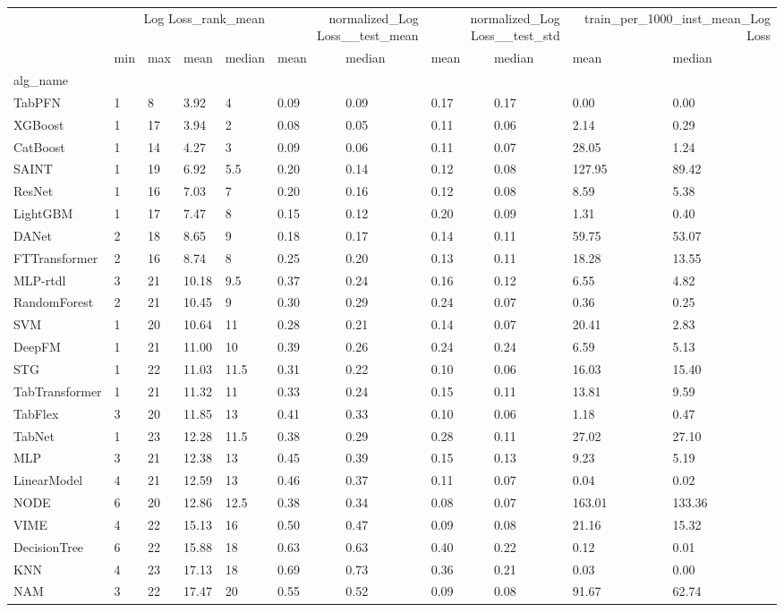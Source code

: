 \begin{tabular}{lllllllllll}
\toprule
 & \multicolumn{4}{r}{Log Loss_rank_mean} & \multicolumn{2}{r}{normalized_Log Loss__test_mean} & \multicolumn{2}{r}{normalized_Log Loss__test_std} & \multicolumn{2}{r}{train_per_1000_inst_mean_Log Loss} \\
 & min & max & mean & median & mean & median & mean & median & mean & median \\
alg_name &  &  &  &  &  &  &  &  &  &  \\
\midrule
TabPFN & 1 & 8 & 3.92 & 4 & 0.09 & 0.09 & 0.17 & 0.17 & 0.00 & 0.00 \\
XGBoost & 1 & 17 & 3.94 & 2 & 0.08 & 0.05 & 0.11 & 0.06 & 2.14 & 0.29 \\
CatBoost & 1 & 14 & 4.27 & 3 & 0.09 & 0.06 & 0.11 & 0.07 & 28.05 & 1.24 \\
SAINT & 1 & 19 & 6.92 & 5.5 & 0.20 & 0.14 & 0.12 & 0.08 & 127.95 & 89.42 \\
ResNet & 1 & 16 & 7.03 & 7 & 0.20 & 0.16 & 0.12 & 0.08 & 8.59 & 5.38 \\
LightGBM & 1 & 17 & 7.47 & 8 & 0.15 & 0.12 & 0.20 & 0.09 & 1.31 & 0.40 \\
DANet & 2 & 18 & 8.65 & 9 & 0.18 & 0.17 & 0.14 & 0.11 & 59.75 & 53.07 \\
FTTransformer & 2 & 16 & 8.74 & 8 & 0.25 & 0.20 & 0.13 & 0.11 & 18.28 & 13.55 \\
MLP-rtdl & 3 & 21 & 10.18 & 9.5 & 0.37 & 0.24 & 0.16 & 0.12 & 6.55 & 4.82 \\
RandomForest & 2 & 21 & 10.45 & 9 & 0.30 & 0.29 & 0.24 & 0.07 & 0.36 & 0.25 \\
SVM & 1 & 20 & 10.64 & 11 & 0.28 & 0.21 & 0.14 & 0.07 & 20.41 & 2.83 \\
DeepFM & 1 & 21 & 11.00 & 10 & 0.39 & 0.26 & 0.24 & 0.24 & 6.59 & 5.13 \\
STG & 1 & 22 & 11.03 & 11.5 & 0.31 & 0.22 & 0.10 & 0.06 & 16.03 & 15.40 \\
TabTransformer & 1 & 21 & 11.32 & 11 & 0.33 & 0.24 & 0.15 & 0.11 & 13.81 & 9.59 \\
TabFlex & 3 & 20 & 11.85 & 13 & 0.41 & 0.33 & 0.10 & 0.06 & 1.18 & 0.47 \\
TabNet & 1 & 23 & 12.28 & 11.5 & 0.38 & 0.29 & 0.28 & 0.11 & 27.02 & 27.10 \\
MLP & 3 & 21 & 12.38 & 13 & 0.45 & 0.39 & 0.15 & 0.13 & 9.23 & 5.19 \\
LinearModel & 4 & 21 & 12.59 & 13 & 0.46 & 0.37 & 0.11 & 0.07 & 0.04 & 0.02 \\
NODE & 6 & 20 & 12.86 & 12.5 & 0.38 & 0.34 & 0.08 & 0.07 & 163.01 & 133.36 \\
VIME & 4 & 22 & 15.13 & 16 & 0.50 & 0.47 & 0.09 & 0.08 & 21.16 & 15.32 \\
DecisionTree & 6 & 22 & 15.88 & 18 & 0.63 & 0.63 & 0.40 & 0.22 & 0.12 & 0.01 \\
KNN & 4 & 23 & 17.13 & 18 & 0.69 & 0.73 & 0.36 & 0.21 & 0.03 & 0.00 \\
NAM & 3 & 22 & 17.47 & 20 & 0.55 & 0.52 & 0.09 & 0.08 & 91.67 & 62.74 \\
\bottomrule
\end{tabular}
